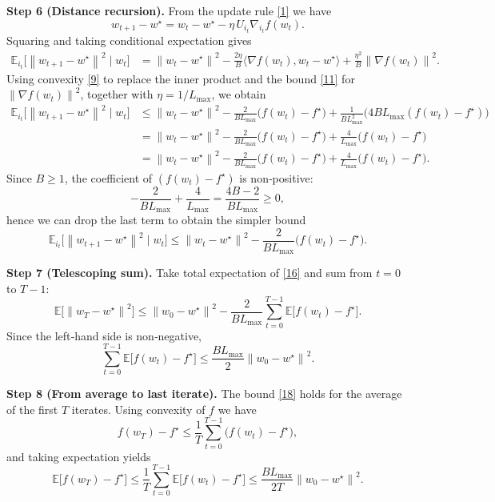 \documentclass{article}
\newcommand{\E}{\mathbb{E}}
\newcommand{\norm}[1]{\left\lVert #1\right\rVert}
\newcommand{\ip}[2]{\langle #1 , #2\rangle}
\newcommand{\block}[1]{U_{#1}}
\begin{document}
\noindent\textbf{Step 6 (Distance recursion).}  
From the update rule \eqref{1} we have
\[
w_{t+1}-w^{\star}=w_{t}-w^{\star}
               -\eta\,\block{i_{t}}\nabla_{i_{t}}f(w_{t}).
\]
Squaring and taking conditional expectation gives
\begin{align}
\E_{i_{t}}\!\bigl[\norm{w_{t+1}-w^{\star}}^{2}\mid w_{t}\bigr]
&= \norm{w_{t}-w^{\star}}^{2}
   -\frac{2\eta}{B}\ip{\nabla f(w_{t})}{w_{t}-w^{\star}}
   +\frac{\eta^{2}}{B}\norm{\nabla f(w_{t})}^{2}.
\tag{14}
\end{align}
Using convexity \eqref{9} to replace the inner product and the bound
\eqref{11} for $\norm{\nabla f(w_{t})}^{2}$, together with $\eta=1/L_{\max}$,
we obtain
\begin{align}
\E_{i_{t}}\!\bigl[\norm{w_{t+1}-w^{\star}}^{2}\mid w_{t}\bigr]
&\le \norm{w_{t}-w^{\star}}^{2}
   -\frac{2}{B L_{\max}}\bigl(f(w_{t})-f^{\star}\bigr)
   +\frac{1}{B L_{\max}^{2}}
      \bigl(4B L_{\max}(f(w_{t})-f^{\star})\bigr) \nonumber\\
&= \norm{w_{t}-w^{\star}}^{2}
   -\frac{2}{B L_{\max}}\bigl(f(w_{t})-f^{\star}\bigr)
   +\frac{4}{L_{\max}}\bigl(f(w_{t})-f^{\star}\bigr) \nonumber\\
&= \norm{w_{t}-w^{\star}}^{2}
   -\frac{2}{B L_{\max}}\bigl(f(w_{t})-f^{\star}\bigr)
   +\frac{4}{L_{\max}}\bigl(f(w_{t})-f^{\star}\bigr) .
\tag{15}
\end{align}
Since $B\ge 1$, the coefficient of $(f(w_{t})-f^{\star})$ is non‑positive:
\[
-\frac{2}{B L_{\max}}+\frac{4}{L_{\max}}
= \frac{4B-2}{B L_{\max}}\ge 0,
\]
hence we can drop the last term to obtain the simpler bound
\[
\E_{i_{t}}\!\bigl[\norm{w_{t+1}-w^{\star}}^{2}\mid w_{t}\bigr]
\le \norm{w_{t}-w^{\star}}^{2}
   -\frac{2}{B L_{\max}}\bigl(f(w_{t})-f^{\star}\bigr).
\tag{16}
\]

\noindent\textbf{Step 7 (Telescoping sum).}  
Take total expectation of \eqref{16} and sum from $t=0$ to $T-1$:
\[
\E\!\bigl[\norm{w_{T}-w^{\star}}^{2}\bigr]
\le \norm{w_{0}-w^{\star}}^{2}
   -\frac{2}{B L_{\max}}\sum_{t=0}^{T-1}\E\!\bigl[f(w_{t})-f^{\star}\bigr].
\tag{17}
\]
Since the left‑hand side is non‑negative,
\[
\sum_{t=0}^{T-1}\E\!\bigl[f(w_{t})-f^{\star}\bigr]
\le \frac{B L_{\max}}{2}\norm{w_{0}-w^{\star}}^{2}.
\tag{18}
\]

\noindent\textbf{Step 8 (From average to last iterate).}  
The bound \eqref{18} holds for the average of the first $T$ iterates.
Using convexity of $f$ we have
\[
f(w_{T})-f^{\star}
\le \frac{1}{T}\sum_{t=0}^{T-1}\bigl(f(w_{t})-f^{\star}\bigr),
\]
and taking expectation yields
\[
\E\!\bigl[f(w_{T})-f^{\star}\bigr]
\le \frac{1}{T}\sum_{t=0}^{T-1}\E\!\bigl[f(w_{t})-f^{\star}\bigr]
\le \frac{B L_{\max}}{2T}\norm{w_{0}-w^{\star}}^{2}.
\tag{19}
\]
\end{document}
